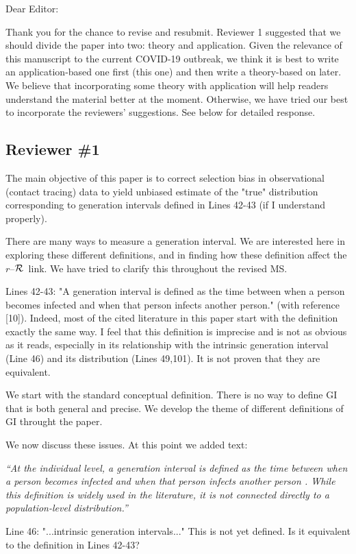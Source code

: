 \documentclass[12pt]{article}
\newcommand{\rR}{\mbox{$r$--$\cal R$}}
\newcommand{\reviewer}{\subsection*}
\newcommand{\revtext}{\textsf}
\newcommand{\newtext}[1]{\textsl{``#1''}}
\begin{document}
\noindent Dear Editor:

Thank you for the chance to revise and resubmit.
Reviewer 1 suggested that we should divide the paper into two: theory and application.
Given the relevance of this manuscript to the current COVID-19 outbreak, we think it is best to write an application-based one first (this one) and then write a theory-based on later.
We believe that incorporating some theory with application will help readers understand the material better at the moment.
Otherwise, we have tried our best to incorporate the reviewers' suggestions.
See below for detailed response.

\reviewer{Reviewer \#1}

\revtext{The main objective of this paper is to correct selection bias in observational
(contact tracing) data to yield unbiased estimate of the "true" distribution
corresponding to generation intervals defined in Lines 42-43 (if I understand
properly).}

There are many ways to measure a generation interval. We are interested here in exploring these different definitions, and in finding how these definition affect the \rR\ link. We have tried to clarify this throughout the revised MS.

\revtext{Lines 42-43: "A generation interval is defined as the time between when a
person becomes infected and when that person infects another person."
(with reference [10]). Indeed, most of the cited literature in this paper
start with the definition exactly the same way. I feel that this definition
is imprecise and is not as obvious as it reads, especially in its relationship
with the intrinsic generation interval (Line 46) and its distribution (Lines
49,101). It is not proven that they are equivalent.}

We start with the standard conceptual definition. There is no way to define GI that is both general and precise. We develop the theme of different definitions of GI throught the paper.

We now discuss these issues. At this point we added text:

\newtext{At the individual level, a generation \emph{interval} is defined as the time between when a person becomes infected and when that person infects another person \citep{svensson2007note}.
While this definition is widely used in the literature, it is not connected directly to a population-level \emph{distribution}.}

\revtext{Line 46: "...intrinsic generation intervals..." This is not yet defined. Is it equivalent to the definition in Lines 42-43?}
\end{document}
